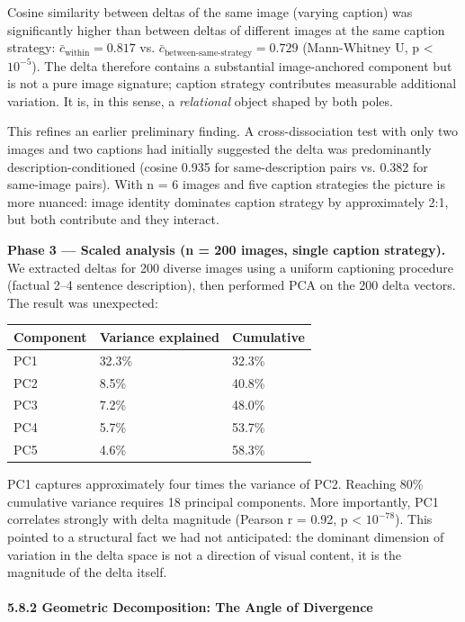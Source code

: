\documentclass[11pt,a4paper]{article}
\begin{document}
Cosine similarity between deltas of the same image (varying caption) was significantly higher than between deltas of different images at the same caption strategy: $\bar{c}_{\text{within}} = 0.817$ vs. $\bar{c}_{\text{between-same-strategy}} = 0.729$ (Mann-Whitney U, p < $10^{-5}$). The delta therefore contains a substantial image-anchored component but is not a pure image signature; caption strategy contributes measurable additional variation. It is, in this sense, a \emph{relational} object shaped by both poles.

This refines an earlier preliminary finding. A cross-dissociation test with only two images and two captions had initially suggested the delta was predominantly description-conditioned (cosine 0.935 for same-description pairs vs. 0.382 for same-image pairs). With n = 6 images and five caption strategies the picture is more nuanced: image identity dominates caption strategy by approximately 2:1, but both contribute and they interact.

\textbf{Phase 3 --- Scaled analysis (n = 200 images, single caption strategy).} We extracted deltas for 200 diverse images using a uniform captioning procedure (factual 2--4 sentence description), then performed PCA on the 200 delta vectors. The result was unexpected:

\begin{center}
\begin{tabular}{lll}
\toprule
Component & Variance explained & Cumulative \\
\midrule
PC1 & 32.3\% & 32.3\% \\
PC2 & 8.5\% & 40.8\% \\
PC3 & 7.2\% & 48.0\% \\
PC4 & 5.7\% & 53.7\% \\
PC5 & 4.6\% & 58.3\% \\
\bottomrule
\end{tabular}
\end{center}

PC1 captures approximately four times the variance of PC2. Reaching 80\% cumulative variance requires 18 principal components. More importantly, PC1 correlates strongly with delta magnitude (Pearson r = 0.92, p < $10^{-78}$). This pointed to a structural fact we had not anticipated: the dominant dimension of variation in the delta space is not a direction of visual content, it is the magnitude of the delta itself.

\paragraph{5.8.2 Geometric Decomposition: The Angle of Divergence}
\end{document}
